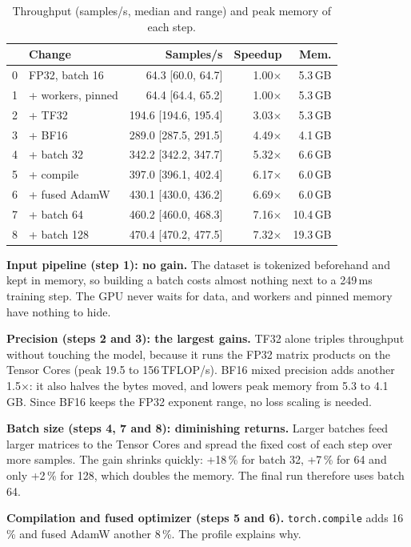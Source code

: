 \documentclass[10pt,a4paper,twocolumn]{article}
\newcommand{\x}{$\times$}
\begin{document}
\begin{table}[H]
\centering\footnotesize
\setlength{\tabcolsep}{3.5pt}
\caption{Throughput (samples/s, median and range) and peak memory of each step.}
\label{tab:steps}
\begin{tabular}{@{}rlrrr@{}}
\toprule
 & Change & Samples/s & Speedup & Mem. \\
\midrule
0 & FP32, batch 16 & 64.3 [60.0, 64.7] & 1.00\x & 5.3\,GB \\
1 & + workers, pinned & 64.4 [64.4, 65.2] & 1.00\x & 5.3\,GB \\
2 & + TF32 & 194.6 [194.6, 195.4] & 3.03\x & 5.3\,GB \\
3 & + BF16 & 289.0 [287.5, 291.5] & 4.49\x & 4.1\,GB \\
4 & + batch 32 & 342.2 [342.2, 347.7] & 5.32\x & 6.6\,GB \\
5 & + compile & 397.0 [396.1, 402.4] & 6.17\x & 6.0\,GB \\
6 & + fused AdamW & 430.1 [430.0, 436.2] & 6.69\x & 6.0\,GB \\
7 & + batch 64 & 460.2 [460.0, 468.3] & 7.16\x & 10.4\,GB \\
8 & + batch 128 & 470.4 [470.2, 477.5] & 7.32\x & 19.3\,GB \\
\bottomrule
\end{tabular}
\end{table}

\textbf{Input pipeline (step 1): no gain.} The dataset is tokenized beforehand and kept in
memory, so building a batch costs almost nothing next to a 249\,ms training step. The GPU never
waits for data, and workers and pinned memory have nothing to hide.

\textbf{Precision (steps 2 and 3): the largest gains.} TF32 alone triples throughput without
touching the model, because it runs the FP32 matrix products on the Tensor Cores (peak
19.5 to 156\,TFLOP/s). BF16 mixed precision adds another 1.5\x{}: it also halves the bytes
moved, and lowers peak memory from 5.3 to 4.1\,GB. Since BF16 keeps the FP32 exponent range,
no loss scaling is needed.

\textbf{Batch size (steps 4, 7 and 8): diminishing returns.} Larger batches feed larger matrices
to the Tensor Cores and spread the fixed cost of each step over more samples. The gain shrinks
quickly: +18\,\% for batch 32, +7\,\% for 64 and only +2\,\% for 128, which doubles the memory.
The final run therefore uses batch 64.

\textbf{Compilation and fused optimizer (steps 5 and 6).} \texttt{torch.compile} adds 16\,\%
and fused AdamW another 8\,\%. The profile explains why.
\end{document}
